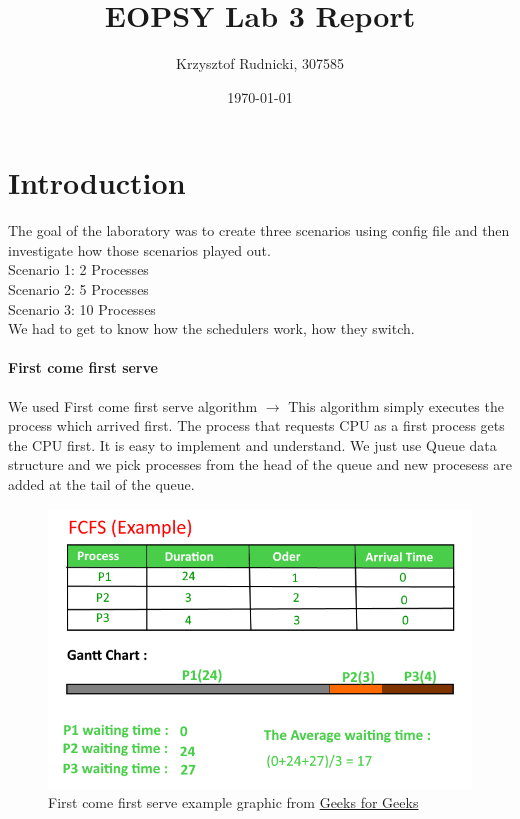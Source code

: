 \documentclass{article}
\begin{document}
\title{EOPSY Lab 3 Report}
\author{Krzysztof Rudnicki, 307585}
\date{\today}
\maketitle
\section{Introduction}
The goal of the laboratory was to create three scenarios using config file and
then investigate how those scenarios played out. \\
Scenario 1: 2 Processes \\
Scenario 2: 5 Processes \\
Scenario 3: 10 Processes \\
We had to get to know how the schedulers work, how they switch. \cite{lab3
Manual} 
\paragraph{First come first serve}
We used First come first serve algorithm $\rightarrow$ This algorithm simply executes the process which
arrived first. The process that requests CPU as a first process gets the CPU
first. It is easy to implement and understand. We just use Queue data structure
and we pick processes from the head of the queue and new procesess are added at
the tail of the queue. \cite{First come first serve}
\begin{figure}[H]
	\caption{First come first serve example graphic from \href{https://www.geeksforgeeks.org/program-for-fcfs-cpu-scheduling-set-1/}{Geeks for
	Geeks}}
	\includegraphics[width=\textwidth]{FCFS}
\end{figure}
\end{document}
